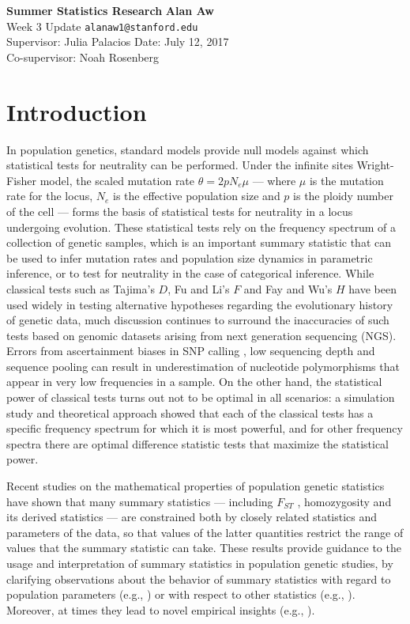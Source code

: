 \documentclass[lettersize, 10pt]{article}
\begin{document}
\noindent
\large{\bfseries{\sffamily Summer Statistics Research}} \hfill {\bfseries{\sffamily Alan Aw}} \\
\normalsize Week 3 Update \hfill \texttt{alanaw1@stanford.edu} \\
Supervisor: Julia Palacios \hfill Date: July 12, 2017\\
Co-supervisor: Noah Rosenberg

\section*{Introduction}

In population genetics, standard models provide null models against which statistical tests for neutrality can be performed. Under the infinite sites Wright-Fisher model, the scaled mutation rate $\theta=2pN_e \mu$ --- where $\mu$ is the mutation rate for the locus, $N_e$ is the effective population size and $p$ is the ploidy number of the cell --- forms the basis of statistical tests for neutrality in a locus undergoing evolution. These statistical tests rely on the frequency spectrum of a collection of genetic samples, which is an important summary statistic that can be used to infer mutation rates and population size dynamics in parametric inference, or to test for neutrality in the case of categorical inference. While classical tests such as Tajima's $D$, Fu and Li's $F$ and Fay and Wu's $H$ have been used widely in testing alternative hypotheses regarding the evolutionary history of genetic data, much discussion continues to surround the inaccuracies of such tests based on genomic datasets arising from next generation sequencing (NGS). Errors from ascertainment biases in SNP calling \cite{Clark2005}, low sequencing depth \cite{Korneliussen2013} and sequence pooling \cite{Ferretti2013} can result in underestimation of nucleotide polymorphisms that appear in very low frequencies in a sample. On the other hand, the statistical power of classical tests turns out not to be optimal in all scenarios: a simulation study and theoretical approach \cite{Ferretti2010} showed that each of the classical tests has a specific frequency spectrum for which it is most powerful, and for other frequency spectra there are optimal difference statistic tests that maximize the statistical power. 

Recent studies on the mathematical properties of population genetic statistics have shown that many summary statistics --- including $F_{ST}$ \cite{Alcala2017,Jakobsson2013}, homozygosity \cite{Reddy2012,Rosenberg2008} and its derived statistics \cite{Garud2015} --- are constrained both by closely related statistics and parameters of the data, so that values of the latter quantities restrict the range of values that the summary statistic can take. These results provide guidance to the usage and interpretation of summary statistics in population genetic studies, by clarifying observations about the behavior of summary statistics with regard to population parameters (e.g., \cite{Alcala2017}) or with respect to other statistics (e.g., \cite{Rosenberg2008}). Moreover, at times they lead to novel empirical insights (e.g., \cite{Garud2015}). 
\end{document}
